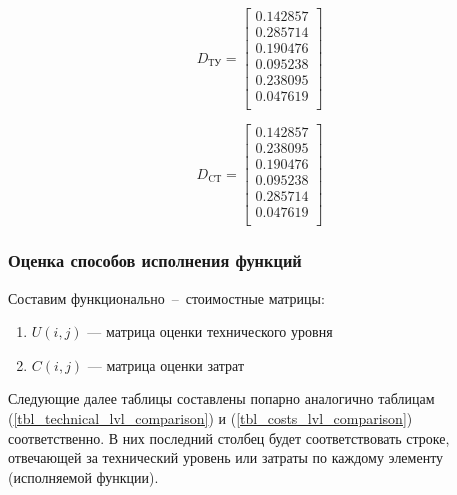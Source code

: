 \begin{equation}
    D_\text{ТУ} =
    \begin{bmatrix}
        0.142857 \\
        0.285714 \\
        0.190476 \\
        0.095238 \\
        0.238095 \\
        0.047619 \\
    \end{bmatrix}
    \label{eq_tu_matrix}
\end{equation}

\begin{equation}
    D_\text{CТ} =
    \begin{bmatrix}
        0.142857 \\
        0.238095 \\
        0.190476 \\
        0.095238 \\
        0.285714 \\
        0.047619 \\
    \end{bmatrix}
    \label{eq_st_matrix}
\end{equation}

\subsubsection{Оценка способов исполнения функций}
Составим функционально~--~стоимостные матрицы:
\begin{enumerate}
    \item $U(i,j)$ --- матрица оценки технического уровня
    \item $C(i,j)$ --- матрица оценки затрат
\end{enumerate}

Следующие далее таблицы составлены попарно аналогично таблицам
(\ref{tbl_technical_lvl_comparison}) и (\ref{tbl_costs_lvl_comparison})
соответственно. В них последний столбец будет соответствовать строке, отвечающей
за технический уровень или затраты по каждому элементу (исполняемой функции).

